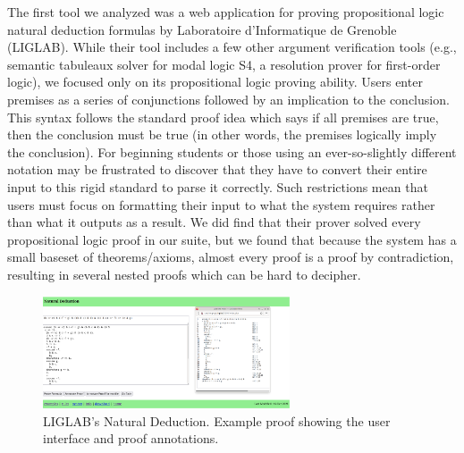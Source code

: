 \documentclass[ms]{uncgdissertationexp2}
\theoremstyle{plain}
\theoremstyle{definition}
\theoremstyle{remark}
\newcommand{\titlecaption}[2]{\caption[#1]{#1. #2}}
\begin{document}
The first tool we analyzed was a web application for proving propositional logic natural deduction formulas by Laboratoire d'Informatique de Grenoble (LIGLAB). While their tool includes a few other argument verification tools (e.g., semantic tabuleaux solver for modal logic S4, a resolution prover for first-order logic), we focused only on its propositional logic proving ability. Users enter premises as a series of conjunctions followed by an implication to the conclusion. This syntax follows the standard proof idea which says if all premises are true, then the conclusion must be true (in other words, the premises logically imply the conclusion). For beginning students or those using an ever-so-slightly different notation may be frustrated to discover that they have to convert their entire input to this rigid standard to parse it correctly. Such restrictions mean that users must focus on formatting their input to what the system requires rather than what it outputs as a result. We did find that their prover solved every propositional logic proof in our suite, but we found that because the system has a small baseset of theorems/axioms, almost every proof is a proof by contradiction, resulting in several nested proofs which can be hard to decipher.
\begin{figure}[h!]
	\centering
	\includegraphics[width=0.65\textwidth]{teachinglogic.png}
	\titlecaption{LIGLAB's Natural Deduction}{Example proof showing the user interface and proof annotations.}
	\label{fig:liglab}
\end{figure} 
\end{document}
